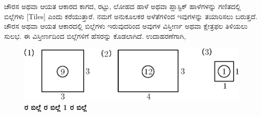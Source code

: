 ಚೌರಸ ಅಥವಾ ಆಯತ ಆಕಾರದ ಕಾಗದ, ರಟ್ಟು, ಲೋಹದ ಹಾಳೆ ಅಥವಾ ಪ್ಲಾಸ್ಟಿಕ್ ಹಾಳೆಗಳನ್ನು ಗಣಿತದಲ್ಲಿ ಬಿಲ್ಲೆಗಳು [Tiles] ಎಂದು ಕರೆಯುತ್ತಾರೆ. ನಮಗೆ ಅನುಕೂಲಕರ ಅಳೆತೆಗಳಿಂದ ಇವುಗಳನ್ನು ತಯಾರಿಸಲು ಬರುತ್ತದೆ. ಚೌರಸ ಅಥವಾ ಆಯತ ಆಕಾರದಲ್ಲಿ ಬಿಲ್ಲೆಗಳು ಇರುವುದರಿಂದ ಅವುಗಳ ವಿಸ್ತೀರ್ಣ ಅಥವಾ ಕ್ಷೇತ್ರಫಲ ತಿಳಿಯಲು ಸುಲಭ. ಈ ವಿಸ್ತೀರ್ಣದಿಂದ ಬಿಲ್ಲೆಗಳಿಗೆ ಹೆಸರನ್ನು ಕೊಡಲಾಗಿದೆ. ಉದಾಹರಣೆಗಾಗಿ, 
\begin{figure}[H]
\centering
\includegraphics[scale=0.8]{src/figure/chap3/fig3-1.eps}\\
\textbf{ ರ ಬಿಲ್ಲೆ  \hspace{1.5cm}  ರ ಬಿಲ್ಲೆ \hspace{2cm} 1 ರ ಬಿಲ್ಲೆ }
\end{figure}



